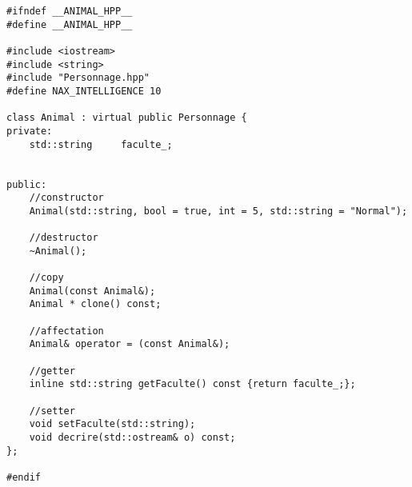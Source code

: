 \begin{lstlisting}[style=c++,caption={Animal.cpp}]
#ifndef __ANIMAL_HPP__
#define __ANIMAL_HPP__

#include <iostream>
#include <string>
#include "Personnage.hpp"
#define NAX_INTELLIGENCE 10

class Animal : virtual public Personnage {
private:
	std::string 	faculte_;


public:
	//constructor
	Animal(std::string, bool = true, int = 5, std::string = "Normal");

	//destructor
	~Animal();

	//copy
	Animal(const Animal&);
	Animal * clone() const;

	//affectation
	Animal& operator = (const Animal&);

	//getter
	inline std::string getFaculte() const {return faculte_;};

	//setter
	void setFaculte(std::string);
	void decrire(std::ostream& o) const;
};

#endif
\end{lstlisting}

